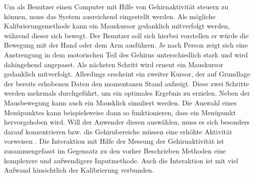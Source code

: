 %
%
\newline \newline
Um als Benutzer einen Computer mit Hilfe von Gehirnaktivität steuern zu können, muss das System ausreichend eingestellt werden. Als mögliche Kalibrierungsmethode kann ein Mauskursor gedanklich mitverfolgt werden, während dieser sich bewegt. Der Benutzer soll sich hierbei vorstellen er würde die Bewegung mit der Hand oder dem Arm ausführen. Je nach Person zeigt sich eine Anstrengung in dem motorischen Teil des Gehirns unterschiedlich stark und wird dahingehend angepasst. Als nächsten Schritt wird erneut ein Mauskursor gedanklich mitverfolgt. Allerdings erscheint ein zweiter Kursor, der auf Grundlage der bereits erhobenen Daten den momentanen Stand aufzeigt. Diese zwei Schritte werden mehrmals durchgeführt, um ein optimales Ergebnis zu erzielen. Neben der Mausbewegung kann auch ein Mausklick simuliert werden. Die Auswahl eines Menüpunktes kann beispielsweise dann so funktionieren, dass ein Menüpunkt hervorgehoben wird. Will der Anwender diesen auswählen, muss es sich besonders darauf konzentrieren bzw. die Gehirnbereiche müssen eine erhöhte Aktivität vorweisen \cite{BrainInt}.
\newline \newline
Die Interaktion mit Hilfe der Messung der Gehirnaktivität ist zusammengefasst im Gegensatz zu den vorher Beschrieben Methoden eine komplexere und aufwendigere Inputmethode. Auch die Interaktion ist mit viel Aufwand hinsichtlich der Kalibrierung verbunden.
